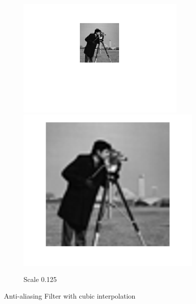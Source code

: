 \documentclass{article}
\begin{document}
\begin{figure}[h!]
\begin{subfigure}[t]{0.3\textwidth}
		\includegraphics[width=\linewidth]{./output_images/DOWN_anti-alias_cubic_scale_0_125000.png}
		\includegraphics[width=\linewidth]{./output_images/UP_anti-alias_cubic_scale_0_125000.png}
		\caption{Scale 0.125}
	\end{subfigure}
	\caption{Anti-aliasing Filter with cubic interpolation}
\end{figure}

\pagebreak
\end{document}
